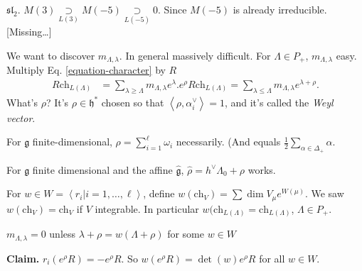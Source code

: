 \begin{example}
\label{example-sl2-characters}
$\mathfrak{sl}_2$. $M(3)\underset{L(3)}{\supset}M(-5)
\underset{L(-5)}{\supset}0$. Since $M(-5)$ is already irreducible.
[Missing…]
\end{example}

We want to discover $m_{\Lambda,\lambda}$. 
In general massively difficult.
For $\Lambda \in P_+$, $m_{\Lambda,\lambda}$ easy.
Multiply Eq. \ref{equation-character} by  $R$
\begin{align*}
R\text{ch}_{L(\Lambda)}&=\sum_{\lambda \geq  \Lambda} m_{\Lambda,\lambda}
e^{\lambda}.
e^{\rho}R\text{ch}_{L(\Lambda)}=\sum_{\lambda \leq  \Lambda}
m_{\Lambda,\lambda}e^{\lambda+\rho}.
\end{align*}
What's $\rho$? It's $\rho \in \mathfrak{h}^*$ chosen so that
$\left<\rho,\alpha_i^\vee\right>=1$, and it's called 
the {\it Weyl vector}.

\begin{remark}
\label{remark-finite-dimension}
For $\mathfrak{g}$ finite-dimensional, $\rho=\sum_{i=1}^\ell \omega_i$ 
necessarily. (And equals $\frac{1}{2}\sum_{\alpha \in \Delta_+}\alpha$.

For $\mathfrak{g}$ finite dimensional and the affine $\hat{\mathfrak{g}}$,
$\hat{\rho}=h^\vee\Lambda_0+\rho$ works.
\end{remark}

For $w \in W=\left<r_i|i=1,\ldots,\ell\right>$,
define $w(\text{ch}_V)=\sum \dim V_\mu e^{W(\mu)}$.
We saw $w(\text{ch}_V)=\text{ch}_V$ if $V$ integrable.
In particular $w(\text{ch}_{L(\Lambda)}=\text{ch}_{L(\Lambda)}$,
$\Lambda \in P_+$.

\begin{lemma}
\label{lemma-for-Weyl-formula}
$m_{\Lambda,\lambda}=0$ unless
$\lambda+\rho=w(\Lambda+\rho)$ for some $w \in W$
\end{lemma}

\medskip\noindent
{\bf Claim.} $r_i(e^{\rho} R)=-e^\rho R$. 
So $w(e^\rho R)=\det(w)e^\rho R$ for all $w \in W$.

